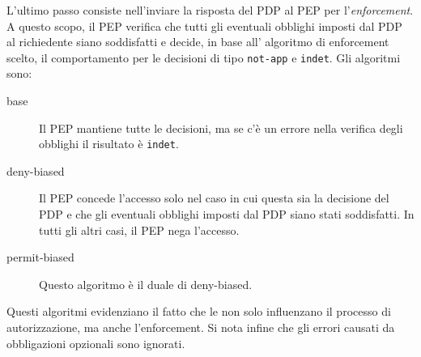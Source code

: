 L'ultimo passo consiste nell'inviare la risposta del PDP al PEP per l'\emph{enforcement}. A questo scopo, il PEP verifica
che tutti gli eventuali obblighi imposti dal PDP al richiedente siano soddisfatti e decide, in base all' algoritmo di
enforcement scelto, il comportamento per le decisioni di tipo \texttt{not-app} e \texttt{indet}. Gli algoritmi sono:
\begin{description}
  \item[base]Il PEP mantiene tutte le decisioni, ma se c'è un errore nella verifica degli obblighi il risultato è \texttt{indet}.
  \item[deny-biased]Il PEP concede l'accesso solo nel caso in cui questa sia la decisione del PDP e che gli eventuali obblighi imposti dal PDP siano stati soddisfatti. In tutti gli altri casi, il PEP nega l’accesso.
  \item[permit-biased]Questo algoritmo è il duale di deny-biased.
\end{description}
Questi algoritmi evidenziano il fatto che le \eobligation non solo influenzano il processo di autorizzazione, ma anche l'enforcement.
Si nota infine che gli errori causati da obbligazioni opzionali sono ignorati.


